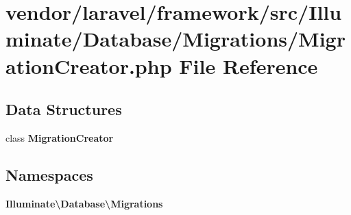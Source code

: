 \section{vendor/laravel/framework/src/\+Illuminate/\+Database/\+Migrations/\+Migration\+Creator.php File Reference}
\label{_migration_creator_8php}
\subsection*{Data Structures}
\begin{DoxyCompactItemize}
\item 
class {\bf Migration\+Creator}
\end{DoxyCompactItemize}
\subsection*{Namespaces}
\begin{DoxyCompactItemize}
\item 
 {\bf Illuminate\textbackslash{}\+Database\textbackslash{}\+Migrations}
\end{DoxyCompactItemize}
